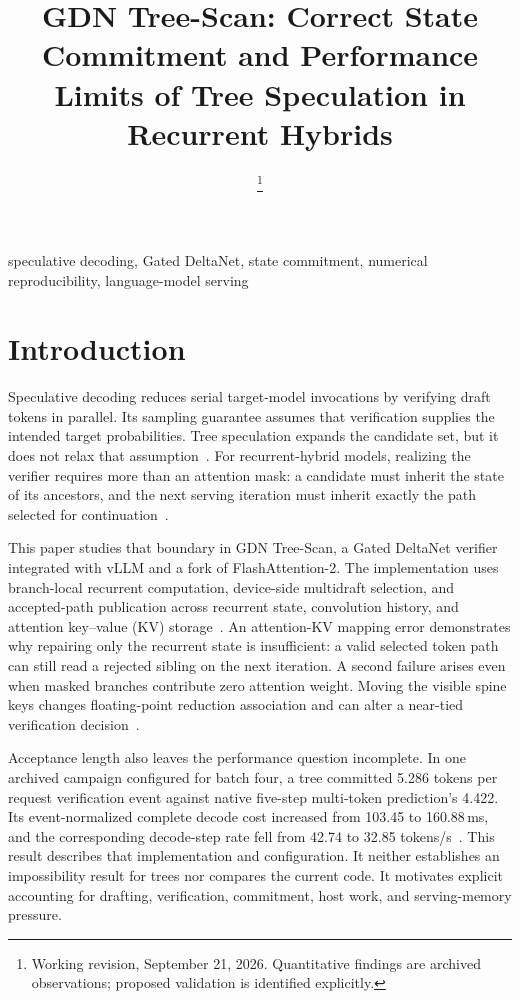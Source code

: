 \documentclass[conference]{IEEEtran}
\newcommand{\sys}{GDN Tree-Scan}
\begin{document}
\title{GDN Tree-Scan: Correct State Commitment and Performance Limits of Tree Speculation in Recurrent Hybrids}
\author{
\thanks{Working revision, September 21, 2026. Quantitative findings are archived observations; proposed validation is identified explicitly.}}
\maketitle

\begin{IEEEkeywords}
speculative decoding, Gated DeltaNet, state commitment, numerical reproducibility, language-model serving
\end{IEEEkeywords}

\section{Introduction}
Speculative decoding reduces serial target-model invocations by verifying draft tokens in parallel. Its sampling guarantee assumes that verification supplies the intended target probabilities. Tree speculation expands the candidate set, but it does not relax that assumption~\cite{leviathan2023fast,chen2023sampling,miao2023specinfer}. For recurrent-hybrid models, realizing the verifier requires more than an attention mask: a candidate must inherit the state of its ancestors, and the next serving iteration must inherit exactly the path selected for continuation~\cite{yang2024gated,wu2025stree}.

This paper studies that boundary in \sys{}, a Gated DeltaNet verifier integrated with vLLM and a fork of FlashAttention-2. The implementation uses branch-local recurrent computation, device-side multidraft selection, and accepted-path publication across recurrent state, convolution history, and attention key--value (KV) storage~\cite{lumo2026receipts,lumo2026stateless}. An attention-KV mapping error demonstrates why repairing only the recurrent state is insufficient: a valid selected token path can still read a rejected sibling on the next iteration. A second failure arises even when masked branches contribute zero attention weight. Moving the visible spine keys changes floating-point reduction association and can alter a near-tied verification decision~\cite{lumo2026spine}.

Acceptance length also leaves the performance question incomplete. In one archived campaign configured for batch four, a tree committed 5.286 tokens per request verification event against native five-step multi-token prediction's 4.422. Its event-normalized complete decode cost increased from 103.45 to 160.88\,ms, and the corresponding decode-step rate fell from 42.74 to 32.85 tokens/s~\cite{lumo2026cost,lumo2026archive}. This result describes that implementation and configuration. It neither establishes an impossibility result for trees nor compares the current code. It motivates explicit accounting for drafting, verification, commitment, host work, and serving-memory pressure.
\end{document}

